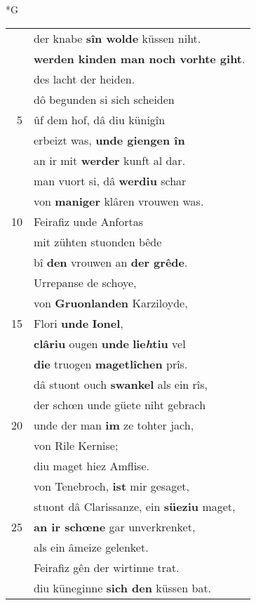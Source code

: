 \documentclass[8pt,a4paper,notitlepage]{article}
\begin{document}
\begin{table}[ht]
\begin{minipage}[t]{0.5\linewidth}
\small
\begin{center}*G
\end{center}
\begin{tabular}{rl}
 & der knabe \textbf{sîn wolde} küssen niht.\\ 
 & \textbf{werden kinden man noch vorhte giht}.\\ 
 & des lacht der heiden.\\ 
 & dô begunden si sich scheiden\\ 
5 & ûf dem hof, dâ diu künigîn\\ 
 & erbeizt was, \textbf{unde giengen în}\\ 
 & an ir mit \textbf{werder} kunft al dar.\\ 
 & man vuort si, dâ \textbf{werdiu} schar\\ 
 & von \textbf{maniger} klâren vrouwen was.\\ 
10 & Feirafiz unde Anfortas\\ 
 & mit zühten stuonden bêde\\ 
 & bî \textbf{den} vrouwen an \textbf{der grêde}.\\ 
 & Urrepanse de schoye,\\ 
 & von \textbf{Gruonlanden} Karziloyde,\\ 
15 & Flori \textbf{unde} \textbf{Ionel},\\ 
 & \textbf{clâriu} ougen \textbf{unde} \textbf{lie\textit{h}tiu} vel\\ 
 & \textbf{die} truogen \textbf{magetlîchen} prîs.\\ 
 & dâ stuont ouch \textbf{swankel} als ein rîs,\\ 
 & der schœn unde güete niht gebrach\\ 
20 & unde der man \textbf{im} ze tohter jach,\\ 
 & von Rile Kernise;\\ 
 & diu maget hiez Amflise.\\ 
 & von Tenebroch, \textbf{ist} mir gesaget,\\ 
 & stuont dâ Clarissanze, ein \textbf{süeziu} maget,\\ 
25 & \textbf{an ir schœne} gar unverkrenket,\\ 
 & als ein âmeize gelenket.\\ 
 & Feirafiz gên der wirtinne trat.\\ 
 & diu küneginne \textbf{sich den} küssen bat.\\ 

\end{tabular}
\end{minipage}
\end{table}
\end{document}
